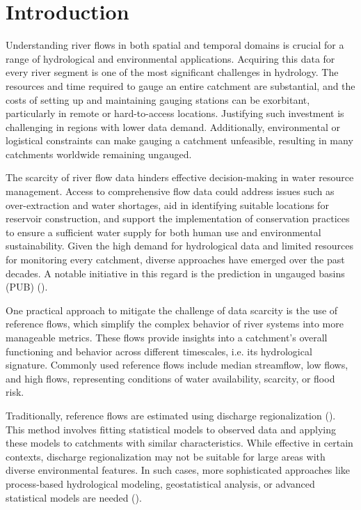 \documentclass[12pt]{article}
\begin{document}
\listoffigures
\clearpage	

\linenumbers %
	
\section{Introduction} \label{sec:intro}

\par Understanding river flows in both spatial and temporal domains is crucial for a range of hydrological and environmental applications. Acquiring this data for every river segment is one of the most significant challenges in hydrology. The resources and time required to gauge an entire catchment are substantial, and the costs of setting up and maintaining gauging stations can be exorbitant, particularly in remote or hard-to-access locations. Justifying such investment is challenging in regions with lower data demand. Additionally, environmental or logistical constraints can make gauging a catchment unfeasible, resulting in many catchments worldwide remaining ungauged.

\par The scarcity of river flow data hinders effective decision-making in water resource management. Access to comprehensive flow data could address issues such as over-extraction and water shortages, aid in identifying suitable locations for reservoir construction, and support the implementation of conservation practices to ensure a sufficient water supply for both human use and environmental sustainability. Given the high demand for hydrological data and limited resources for monitoring every catchment, diverse approaches have emerged over the past decades. A notable initiative in this regard is the prediction in ungauged basins (PUB) (\cite{bloschl2013, hrachowitz2013}).

\par One practical approach to mitigate the challenge of data scarcity is the use of reference flows, which simplify the complex behavior of river systems into more manageable metrics. These flows provide insights into a catchment's overall functioning and behavior across different timescales, i.e. its hydrological signature. Commonly used reference flows include median streamflow, low flows, and high flows, representing conditions of water availability, scarcity, or flood risk.

\par Traditionally, reference flows are estimated using discharge regionalization (\cite{laaha2006}). This method involves fitting statistical models to observed data and applying these models to catchments with similar characteristics. While effective in certain contexts, discharge regionalization may not be suitable for large areas with diverse environmental features. In such cases, more sophisticated approaches like process-based hydrological modeling, geostatistical analysis, or advanced statistical models are needed (\cite{bloschl2013}).
\end{document}
